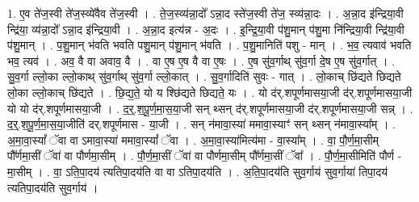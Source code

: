 \documentclass[17pt]{extarticle}
\begin{document}
1. ए॒व ते॑ज॒स्वी ते॑ज॒स्व्ये॑वैव ते॑ज॒स्वी । . ते॒ज॒स्व्य॑न्ना॒दो᳚ ऽन्ना॒द स्ते॑ज॒स्वी ते॑ज॒ स्व्य॑न्ना॒दः । . अ॒न्ना॒द इ॑न्द्रिया॒वी न्द्रि॑या॒ व्य॑न्ना॒दो᳚ ऽन्ना॒द इ॑न्द्रिया॒वी । . अ॒न्ना॒द इत्य॑न्न - अ॒दः । . इ॒न्द्रि॒या॒वी प॑शु॒मान् प॑शु॒मा नि॑न्द्रिया॒वी न्द्रि॑या॒वी प॑शु॒मान् । . प॒शु॒मान् भ॑वति भवति पशु॒मान् प॑शु॒मान् भ॑वति । . प॒शु॒मानिति॑ पशु - मान् । . भ॒व॒ त्यवाव॑ भवति भव॒ त्यव॑ । . अव॒ वै वा अवाव॒ वै । . वा ए॒ष ए॒ष वै वा ए॒षः । . ए॒ष सु॑व॒र्गाथ् सु॑व॒र्गा दे॒ष ए॒ष सु॑व॒र्गात् । . सु॒व॒र्गा ल्लो॒का ल्लो॒काथ् सु॑व॒र्गाथ् सु॑व॒र्गा ल्लो॒कात् । . सु॒व॒र्गादिति॑ सुवः - गात् । . लो॒काच् छि॑द्यते छिद्यते लो॒का ल्लो॒काच् छि॑द्यते । . छि॒द्य॒ते॒ यो य श्छि॑द्यते छिद्यते॒ यः । . यो द॑र्.शपूर्णमासया॒जी द॑र्.शपूर्णमासया॒जी यो यो द॑र्.शपूर्णमासया॒जी । . द॒र्॒.श॒पू॒र्ण॒मा॒स॒या॒जी सन् थ्सन् द॑र्.शपूर्णमासया॒जी द॑र्.शपूर्णमासया॒जी सन्न् । . द॒र्॒.श॒पू॒र्ण॒मा॒स॒या॒जीति॑ दर्.शपूर्णमास - या॒जी । . सन् न॑मावा॒स्या॑ ममावा॒स्याꣳ॑ सन् थ्सन् न॑मावा॒स्या᳚म् । . अ॒मा॒वा॒स्यां᳚ ॅवा वा ऽमावा॒स्या॑ ममावा॒स्यां᳚ ॅवा । . अ॒मा॒वा॒स्या॑मित्य॑मा - वा॒स्या᳚म् । . वा॒ पौ॒र्ण॒मा॒सीम् पौ᳚र्णमा॒सीं ॅवा॑ वा पौर्णमा॒सीम् । . पौ॒र्ण॒मा॒सीं ॅवा॑ वा पौर्णमा॒सीम् पौ᳚र्णमा॒सीं ॅवा᳚ । . पौ॒र्ण॒मा॒सीमिति॑ पौर्ण - मा॒सीम् । . वा॒ ऽति॒पा॒दय॑ त्यतिपा॒दय॑ति वा वा ऽतिपा॒दय॑ति । . अ॒ति॒पा॒दय॑ति सुव॒र्गाय॑ सुव॒र्गाया॑ तिपा॒दय॑ त्यतिपा॒दय॑ति सुव॒र्गाय॑ । \newline
\end{document}
